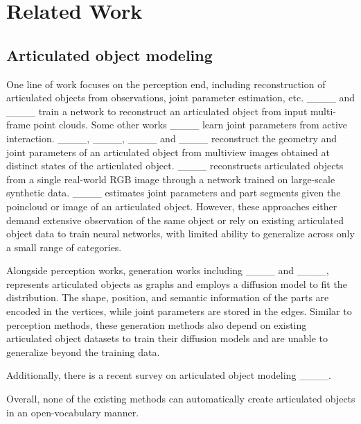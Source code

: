 \section{Related Work}
\subsection{Articulated object modeling} 
One line of work focuses on the perception end, including reconstruction of articulated objects from observations, joint parameter estimation, etc. ____ and ____ train a network to reconstruct an articulated object from input multi-frame point clouds. Some other works ____ learn joint parameters from active interaction. ____, ____, ____ and ____ reconstruct the geometry and joint parameters of an articulated object from multiview images obtained at distinct states of the articulated object. ____ reconstructs articulated objects from a single real-world RGB image through a network trained on large-scale synthetic data. ____ estimates joint parameters and part segments given the poincloud or image of an articulated object. However, these approaches either demand extensive observation of the same object or rely on existing articulated object data to train neural networks, with limited ability to generalize across only a small range of categories.

Alongside perception works, generation works including  ____ and ____, represents articulated objects as graphs and employs a diffusion model to fit the distribution. The shape, position, and semantic information of the parts are encoded in the vertices, while joint parameters are stored in the edges.  Similar to perception methods, these generation methods also depend on existing articulated object datasets to train their diffusion models and are unable to generalize beyond the training data. 

Additionally, there is a recent survey on articulated object modeling ____.

Overall, none of the existing methods can automatically create articulated objects in an open-vocabulary manner. 

